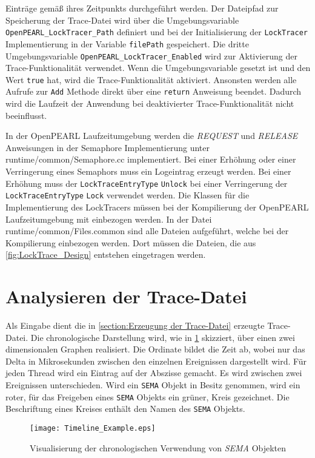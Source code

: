 Einträge gemäß ihres Zeitpunkts durchgeführt werden. Der Dateipfad zur
Speicherung der Trace-Datei wird über die Umgebungsvariable
\texttt{OpenPEARL\_LockTracer\_Path} definiert und bei der Initialisierung der
\texttt{LockTracer} Implementierung in der Variable \texttt{filePath}
gespeichert. Die dritte Umgebungsvariable
\texttt{OpenPEARL\_LockTracer\_Enabled} wird zur Aktivierung der
Trace-Funktionalität verwendet. Wenn die Umgebungsvariable gesetzt ist und den
Wert \texttt{true} hat, wird die Trace-Funktionalität aktiviert. Ansonsten
werden alle Aufrufe zur \texttt{Add} Methode direkt über eine \texttt{return}
Anweisung beendet. Dadurch wird die Laufzeit der Anwendung bei deaktivierter
Trace-Funktionalität nicht beeinflusst.

In der OpenPEARL Laufzeitumgebung werden die \textit{REQUEST} und
\textit{RELEASE} Anweisungen in der Semaphore Implementierung unter
runtime/common/Semaphore.cc implementiert. Bei einer Erhöhung oder einer
Verringerung eines Semaphors muss ein Logeintrag erzeugt werden. Bei einer
Erhöhung muss der \texttt{LockTraceEntryType} \texttt{Unlock} bei einer
Verringerung der \texttt{LockTraceEntryType} \texttt{Lock} verwendet werden. Die
Klassen für die Implementierung des LockTracers müssen bei der Kompilierung der
OpenPEARL Laufzeitumgebung mit einbezogen werden. In der Datei
runtime/common/Files.common sind alle Dateien aufgeführt, welche bei der
Kompilierung einbezogen werden. Dort müssen die Dateien, die aus
\cref{fig:LockTrace_Design} entstehen eingetragen werden.

\section{Analysieren der Trace-Datei}
\label{section:Analysieren der Trace-Datei}
Als Eingabe dient die in \cref{section:Erzeugung der Trace-Datei} erzeugte
Trace-Datei. Die chronologische Darstellung wird, wie in
\cref{fig:Timeline_Example} skizziert, über einen zwei dimensionalen Graphen
realisiert. Die Ordinate bildet die Zeit ab, wobei nur das Delta in
Mikrosekunden zwischen den einzelnen Ereignissen dargestellt wird. Für jeden
Thread wird ein Eintrag auf der Abszisse gemacht. Es wird zwischen zwei
Ereignissen unterschieden. Wird ein \texttt{SEMA} Objekt in Besitz genommen,
wird ein roter, für das Freigeben eines \texttt{SEMA} Objekts ein grüner, Kreis
gezeichnet. Die Beschriftung eines Kreises enthält den Namen des \texttt{SEMA}
Objekts.

\begin{figure}[ht]
  \texttt{[image: Timeline\_Example.eps]}
  \caption{Visualisierung der chronologischen Verwendung von \textit{SEMA} Objekten}
  \label{fig:Timeline_Example}
\end{figure}

